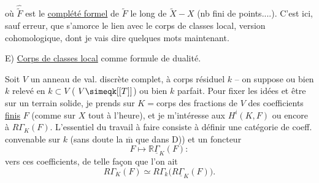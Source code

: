 où $\widehat{\widetilde F}$ est le \uline{complété formel} de $\widetilde F$ le long de $\widetilde X-X$ (nb fini de points....). C'est ici, sauf erreur, que s'amorce le lien avec le corps de classes local, version cohomologique, dont je vais dire quelques mots maintenant.

E) \uline{Corps de classes local} comme formule de dualité.

Soit $V$ un anneau de val. discrète complet, à corps résiduel $k$ -- on suppose ou bien $k$ relevé en $k\subset V$ ( $V\simeqk[[T]]$) ou bien $k$ parfait. Pour fixer les idées et être sur un terrain solide, je prends  sur $K={}$corps des fractions de $V$ des coefficients \uline{finis} $F$ (comme sur $X$ tout à l'heure), et je m'intéresse aux $H^i(K,F)$ ou encore à $R\Gamma_K(F)$. L'essentiel du travail à faire consiste à définir une catégorie de coeff. convenable sur $k$ (sans doute la $\overline{\mathrm m}$ que dans D)) et un foncteur
\[
 F\longmapsto\mathbb{R}\underline{\Gamma}_K(F):
\]
vers ces coefficients, de telle façon que l'on ait
\[
 R\Gamma_K(F)\simeq R\Gamma_{k}\bigl(R\underline{\Gamma}_K(F)\bigr).
\]
